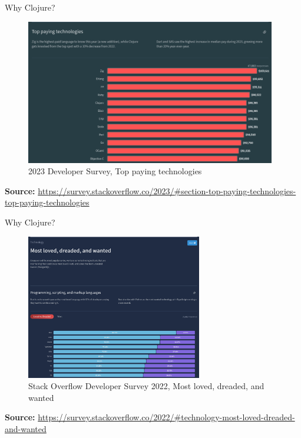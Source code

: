 \documentclass[ignorenonframetext,]{beamer}
\begin{document}
\begin{frame}{Why Clojure?}
\protect\hypertarget{why-clojure-1}{}

\begin{figure}
\centering
\includegraphics[width=\textwidth,height=2.5in]{Stack-Overflow-Developer-Survey-2023-top-paying-technologies.png}
\caption{2023 Developer Survey, Top paying technologies}
\end{figure}

\textbf{Source:}
\url{https://survey.stackoverflow.co/2023/\#section-top-paying-technologies-top-paying-technologies}

\end{frame}

\begin{frame}{Why Clojure?}
\protect\hypertarget{why-clojure-2}{}

\begin{figure}
\centering
\includegraphics[width=\textwidth,height=2.5in]{Stack-Overflow-Developer-Survey-2022-most-loved-dreaded-and-wanted-language-love-dread.png}
\caption{Stack Overflow Developer Survey 2022, Most loved, dreaded, and
wanted}
\end{figure}

\textbf{Source:}
\url{https://survey.stackoverflow.co/2022/\#technology-most-loved-dreaded-and-wanted}

\end{frame}
\end{document}
